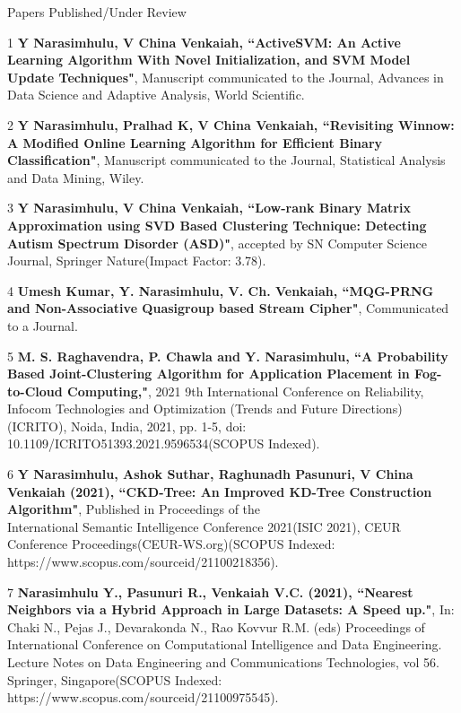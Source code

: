 \documentclass{resume} %
\begin{document}
\pagebreak

\begin{rSection}{Papers Published/Under Review}
	
	\begin{rSubsection}{}{}{}{}
		
		\item[1] \textbf{Y Narasimhulu, V China Venkaiah, ``ActiveSVM: An Active Learning Algorithm With Novel Initialization, and SVM Model Update Techniques"}, Manuscript communicated to the Journal, Advances in Data Science and Adaptive Analysis, World Scientific. 
		
		\item[2] \textbf{Y Narasimhulu, Pralhad K, V China Venkaiah, ``Revisiting Winnow: A Modified Online Learning Algorithm for Efficient Binary Classification"}, Manuscript communicated to the Journal, Statistical Analysis and Data Mining, Wiley.
		
		\item[3] \textbf{Y Narasimhulu, V China Venkaiah, ``Low-rank Binary Matrix Approximation using SVD Based Clustering Technique: Detecting Autism Spectrum Disorder (ASD)"}, accepted by SN Computer Science Journal, Springer Nature(Impact Factor: 3.78).
		
		\item[4] \textbf{Umesh Kumar, Y. Narasimhulu, V. Ch. Venkaiah, ``MQG-PRNG and Non-Associative Quasigroup based Stream Cipher"}, Communicated to a Journal.
		
		\item[5] \textbf{M. S. Raghavendra, P. Chawla and Y. Narasimhulu, ``A Probability Based Joint-Clustering Algorithm for Application Placement in Fog-to-Cloud Computing,"}, 2021 9th International Conference on Reliability, Infocom Technologies and Optimization (Trends and Future Directions) (ICRITO), Noida, India, 2021, pp. 1-5, doi: 10.1109/ICRITO51393.2021.9596534(SCOPUS Indexed).
		
		\item[6] \textbf{Y Narasimhulu, Ashok Suthar, Raghunadh Pasunuri, V China Venkaiah (2021), ``CKD-Tree: An Improved KD-Tree Construction Algorithm"}, Published in Proceedings of the \\ International Semantic Intelligence Conference 2021(ISIC 2021), CEUR Conference Proceedings(CEUR-WS.org)(SCOPUS Indexed: https://www.scopus.com/sourceid/21100218356).
		
		\item[7] \textbf{Narasimhulu Y., Pasunuri R., Venkaiah V.C. (2021), ``Nearest Neighbors via a Hybrid Approach in Large Datasets: A Speed up."}, In: Chaki N., Pejas J., Devarakonda N., Rao Kovvur R.M. (eds) Proceedings of International Conference on Computational Intelligence and Data Engineering. Lecture Notes on Data Engineering and Communications Technologies, vol 56. Springer, Singapore(SCOPUS Indexed: https://www.scopus.com/sourceid/21100975545).
		

\end{rSubsection}
\end{rSection}
\end{document}
